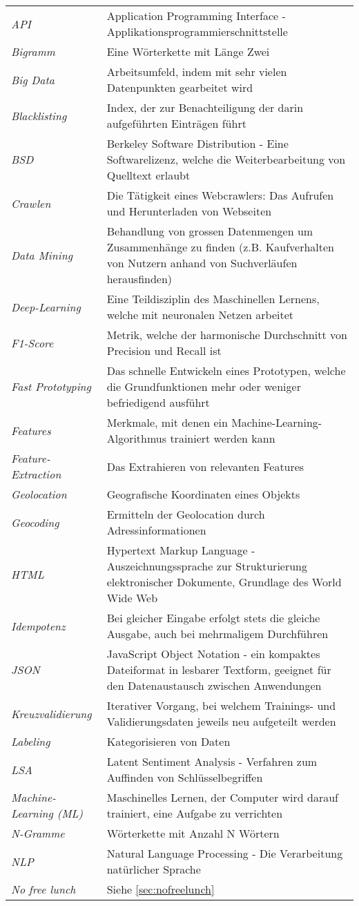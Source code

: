 \begin{table}[H]
	\begin{tabular}{>{\em}p{4cm}p{12cm}}
		API & Application Programming Interface - Applikationsprogrammierschnittstelle\\
		Bigramm & Eine Wörterkette mit Länge Zwei\\
		Big Data & Arbeitsumfeld, indem mit sehr vielen Datenpunkten gearbeitet wird\\
		Blacklisting & Index, der zur Benachteiligung der darin aufgeführten Einträgen führt\\
		BSD & Berkeley Software Distribution - Eine Softwarelizenz, welche die Weiterbearbeitung von Quelltext erlaubt\\
		Crawlen & Die Tätigkeit eines Webcrawlers: Das Aufrufen und Herunterladen von Webseiten\\
		Data Mining & Behandlung von grossen Datenmengen um Zusammenhänge zu finden (z.B. Kaufverhalten von Nutzern anhand von Suchverläufen herausfinden)\\
		Deep-Learning & Eine Teildisziplin des Maschinellen Lernens, welche mit neuronalen Netzen arbeitet\\
		F1-Score & Metrik, welche der harmonische Durchschnitt von Precision und Recall ist\\
		Fast Prototyping & Das schnelle Entwickeln eines Prototypen, welche die Grundfunktionen mehr oder weniger befriedigend ausführt\\
		Features & Merkmale, mit denen ein Machine-Learning-Algorithmus trainiert werden kann\\
		Feature-Extraction & Das Extrahieren von relevanten Features\\
		Geolocation & Geografische Koordinaten eines Objekts\\
		Geocoding & Ermitteln der Geolocation durch Adressinformationen\\
		HTML & Hypertext Markup Language - Auszeichnungssprache zur Strukturierung elektronischer Dokumente, Grundlage des World Wide Web\\
		Idempotenz & Bei gleicher Eingabe erfolgt stets die gleiche Ausgabe, auch bei mehrmaligem Durchführen\\
		JSON & JavaScript Object Notation - ein kompaktes Dateiformat in lesbarer Textform, geeignet für den Datenaustausch zwischen Anwendungen\\
		Kreuzvalidierung & Iterativer Vorgang, bei welchem Trainings- und Validierungsdaten jeweils neu aufgeteilt werden\\
		Labeling & Kategorisieren von Daten\\
		LSA & Latent Sentiment Analysis - Verfahren zum Auffinden von Schlüsselbegriffen\\
		Machine-Learning (ML) & Maschinelles Lernen, der Computer wird darauf trainiert, eine Aufgabe zu verrichten\\
		N-Gramme & Wörterkette mit Anzahl N Wörtern\\
		NLP & Natural Language Processing - Die Verarbeitung natürlicher Sprache\\
		No free lunch & Siehe \cref{sec:nofreelunch}\\
		

\end{tabular}
\end{table}
